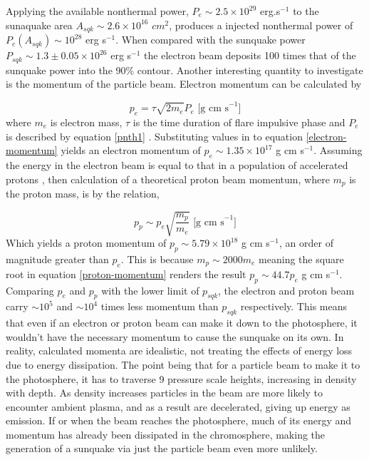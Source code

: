 Applying the available nonthermal power, $P_e \sim 2.5{\times}10^{29}$ erg.s$^{-1}$ to the sunaquake area $A_{sqk} \sim 2.6{\times}10^{16}$ $cm^{2}$, produces a injected nonthermal power of $P_{e}(A_{sqk}) \sim 10^{28}$ erg s$^{-1}$. When compared with the sunquake power $P_{sqk} \sim 1.3\pm0.05{\times}10^{26}$ erg s$^{-1}$ the electron beam deposits 100 times that of the sunquake power into the 90\% contour. Another interesting quantity to investigate is the momentum of the particle beam. Electron momentum can be calculated by 


\begin{equation}\label{electron-momentum}
p_e=\tau \sqrt{2m_e} P_{e} \text{ [g cm s}^{-1}]
\end{equation}
\noindent
where $m_e$ is electron mass, $\tau$ is the time duration of flare impulsive phase and $P_{e}$ is described by equation \ref{pnth1} \citep{2015ApJ...807..102S}. Substituting values in to equation \ref{electron-momentum} yields an electron momentum of $p_e \sim 1.35{\times}10^{17}$ g cm s$^{-1}$. Assuming the energy in the electron beam is equal to that in a population of accelerated protons \citep{2000ApJ...542..513E}, then calculation of a theoretical proton beam momentum, where $m_p$ is the proton mass, is by the relation,

\begin{equation}\label{proton-momentum}
p_p \sim p_e \sqrt{\frac{m_p}{m_e}} \text{ [g cm s}^{-1}]
\end{equation}
\noindent
Which yields a proton momentum of $p_p \sim 5.79{\times}10^{18}$ g cm s$^{-1}$, an order of magnitude greater than $p_e$. This is because $m_p \sim 2000m_e$ meaning the square root in equation \ref{proton-momentum} renders the result $p_p \sim 44.7p_e$ g cm s$^{-1}$. Comparing $p_{e}$ and $p_{p}$ with the lower limit of $p_{sqk}$, the electron and proton beam carry $\sim 10^{5}$ and $\sim 10^{4}$ times less momentum than $p_{sqk}$ respectively. This means that even if an electron or proton beam can make it down to the photosphere, it wouldn't have the necessary momentum to cause the sunquake on its own. In reality, calculated momenta are idealistic, not treating the effects of energy loss due to energy dissipation. The point being that for a particle beam to make it to the photosphere, it has to traverse 9 pressure scale heights, increasing in density with depth. As density increases particles in the beam are more likely to encounter ambient plasma, and as a result are decelerated, giving up energy as emission. If or when the beam reaches the photosphere, much of its energy and momentum has already been dissipated in the chromosphere, making the generation of a sunquake via just the particle beam even more unlikely. \\

